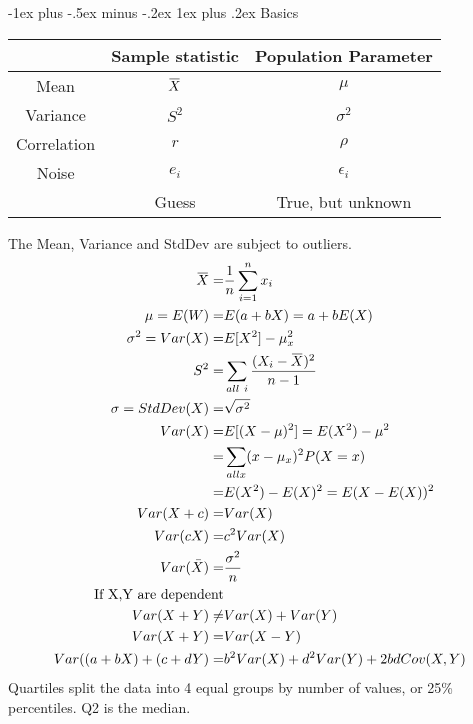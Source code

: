 \documentclass[10pt,landscape]{article}
\makeatletter
\renewcommand{\subsubsection}{\@startsection{subsubsection}{3}{0mm}%
                                {-1ex plus -.5ex minus -.2ex}%
                                {1ex plus .2ex}%
                                {\normalfont\small\bfseries}}
\newcommand{\overbar}[1]{\mkern 1.5mu\overline{\mkern-1.5mu#1\mkern-1.5mu}\mkern 1.5mu}
\makeatother
\begin{document}
\raggedright
\footnotesize
\begin{multicols*}{3}


\setlength{\premulticols}{1pt}
\setlength{\postmulticols}{1pt}
\setlength{\multicolsep}{1pt}
\setlength{\columnsep}{2pt}
\setlength{\columnseprule}{1pt}


\subsubsection{Basics}

\begin{tabular}{| c | c | c| }
\hline
 & Sample statistic &  Population Parameter \\
 \hline
 Mean & $\overbar{X}$ & $\mu$ \\
 Variance & $S^2$ & $\sigma^2$ \\
 Correlation & $r$ & $\rho$ \\
  Noise & $e_i$ & $\epsilon_i$ \\
\hline
& Guess & True, but unknown \\
\hline
\end{tabular}

The Mean, Variance and StdDev are subject to outliers.
\begin{align*}
\overbar{X} =& \frac{1}{n} \sum\limits_{i=1}^n x_i \\
\mu = E(W) =& E(a + bX) = a + bE(X)\\
\sigma^2 = Var(X) =& E[X^2] - \mu_x^2\\
S^2 =& \sum\limits_{all\ i} \frac{(X_i - \overbar{X})^2}{n-1}\\
\sigma = StdDev(X) =& \sqrt{\sigma^2}\\
Var(X) =& E[(X - \mu)^2]  = E(X^2) - \mu^2\\
	=& \sum_{all x} (x - \mu_x)^2 P(X = x)\\
	=& E(X^2) - E(X)^2 = E(X - E(X))^2\\
Var(X + c) =& Var(X)\\
Var(cX) =& c^2Var(X)\\
Var(\bar{X}) =& \frac{\sigma^2}{n} \\
 \text{If X,Y are dependent}\\
Var(X+Y) \ne& Var(X) + Var(Y)\\
Var(X + Y) =& Var(X - Y)\\
Var((a + bX) + (c + dY) =& b^2Var(X) + d^2Var(Y) + 2bdCov(X,Y)\\
\end{align*}
Quartiles split the data into 4 equal groups by number of values, or 25\% percentiles.
Q2 is the median.



\end{multicols*}
\end{document}
